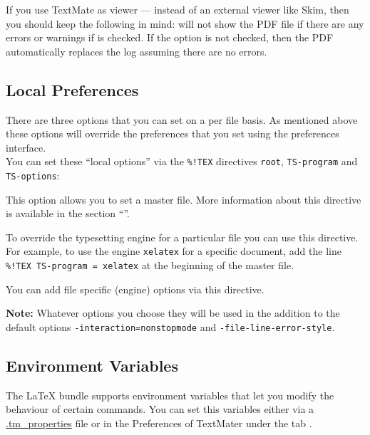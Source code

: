 \documentclass[11pt, x11names]{article}
\begin{document}
If you use TextMate as viewer — instead of an external viewer like Skim, then you should keep the following in mind:  will not show the PDF file if there are any errors or warnings if  is checked. If the option is not checked, then the PDF automatically replaces the log assuming there are no errors.

\subsection{Local Preferences}
\label{sec:Local_Preferences}

There are three options that you can set on a per file basis. As mentioned above these options will override the preferences that you set using the preferences interface.\\

You can set these “local options” via the \texttt{\%!TEX} directives \texttt{root}, \texttt{TS-program} and \texttt{TS-options}:

\begin{description}[style=multiline, leftmargin=2.4cm]

    \item[\texttt{root}] This option allows you to set a master file. More information about this directive is available in the section “”.

    \item[\texttt{TS-program}] To override the typesetting engine for a particular file you can use this directive. For example, to use the engine \texttt{xelatex} for a specific document, add the line \texttt{\%!TEX\ TS-program\ =\ xelatex} at the beginning of the master file.
    \emph\emph{{}}
    \item[\texttt{TS-options}] You can add file specific (engine) options via this directive.

    \textbf{Note:} Whatever options you choose they will be used in the addition to the default options \texttt{-interaction=nonstopmode} and \texttt{-file-line-error-style}.

\end{description}

\subsection{Environment Variables}

The LaTeX bundle supports environment variables that let you modify the behaviour of certain commands. You can set this variables either via a \href{http://blog.macromates.com/2011/git-style-configuration}{.tm\_properties} file or in the Preferences of TextMater under the tab .
\end{document}

